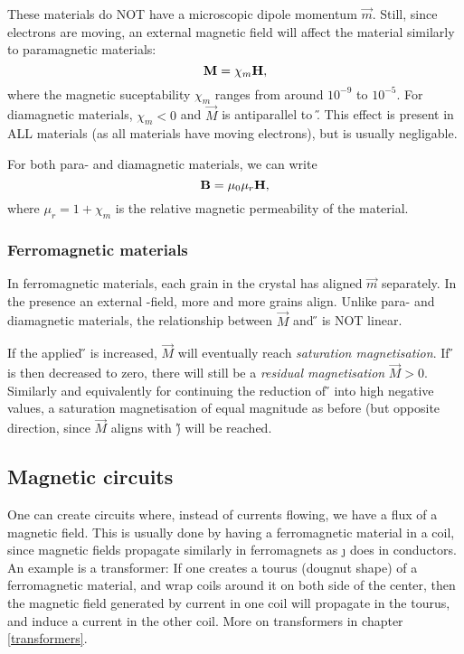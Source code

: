         These materials do NOT have a microscopic dipole momentum $\vec{m}$. Still, since electrons are moving, 
        an external magnetic field will affect the material similarly to paramagnetic materials:
        \begin{equation}
            \mathbf{M} = \chi_m\mathbf{H},
        \end{equation}
        where the magnetic suceptability $\chi_m$ ranges from around $10^{-9}$ to $10^{-5}$. 
        For diamagnetic materials, $\chi_m < 0$ and $\vec{M}$ is antiparallel to \H. 
        This effect is present in ALL materials (as all materials have moving electrons), but is usually negligable.
    
    For both para- and diamagnetic materials, we can write
    \begin{equation}
        \label{B eq mu H}
        \mathbf{B} = \mu_0 \mu_r \mathbf{H},
    \end{equation}
    where $\mu_r = 1+\chi_m$ is the relative magnetic permeability of the material.
    
    \subsubsection{Ferromagnetic materials}
        In ferromagnetic materials, each grain in the crystal has aligned $\vec{m}$ separately. 
        In the presence an external \B-field, more and more grains align. 
        Unlike para- and diamagnetic materials, the relationship between $\vec{M}$ and \H{} is NOT linear.

        If the applied \H{} is increased, $\vec{M}$ will eventually reach \textit{saturation magnetisation}. 
        If \H{} is then decreased to zero, there will still be a \textit{residual magnetisation} $\vec{M} > 0$. 
        Similarly and equivalently for continuing the reduction of \H{} into high negative values, 
        a saturation magnetisation of equal magnitude as before (but opposite direction, since $\vec{M}$ aligns with \H) will be reached.

\subsection{Magnetic circuits}
    One can create circuits where, instead of currents flowing, we have a flux of a magnetic field. 
    This is usually done by having a ferromagnetic material in a coil, since magnetic fields propagate similarly in ferromagnets as \j{} does in conductors.
    An example is a transformer: 
    If one creates a tourus (dougnut shape) of a ferromagnetic material, and wrap coils around it on both side of the center, 
    then the magnetic field generated by current in one coil will propagate in the tourus,
    and induce a current in the other coil. More on transformers in chapter \ref{transformers}.

